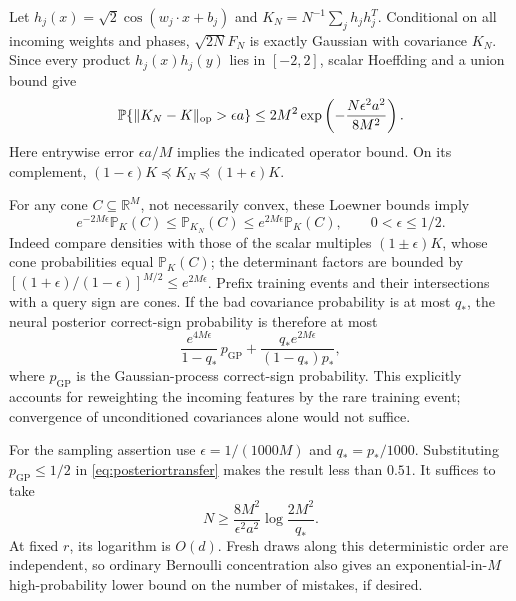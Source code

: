 \documentclass[11pt]{article}
\newcommand{\Pp}{\mathbb P}
\newcommand{\R}{\mathbb R}
\begin{document}
Let $h_j(x)=\sqrt2\cos(w_j\cdot x+b_j)$ and
$K_N=N^{-1}\sum_j h_jh_j^T$. Conditional on all incoming weights and
phases, $\sqrt{2N}F_N$ is exactly Gaussian with covariance $K_N$.
Since every product $h_j(x)h_j(y)$ lies in $[-2,2]$, scalar Hoeffding
and a union bound give
\begin{equation}\label{eq:covconcentration}
 \Pp\{\|K_N-K\|_{\rm op}>\epsilon a\}
 \le2M^2\exp\left(-\frac{N\epsilon^2a^2}{8M^2}\right).
\end{equation}
Here entrywise error $\epsilon a/M$ implies the indicated operator
bound. On its complement,
$(1-\epsilon)K\preceq K_N\preceq(1+\epsilon)K$.

For any cone $C\subseteq\R^M$, not necessarily convex, these Loewner
bounds imply
\begin{equation}\label{eq:coneratio}
 e^{-2M\epsilon}\Pp_K(C)\le\Pp_{K_N}(C)
                 \le e^{2M\epsilon}\Pp_K(C),\qquad 0<\epsilon\le1/2.
\end{equation}
Indeed compare densities with those of the scalar multiples
$(1\pm\epsilon)K$, whose cone probabilities equal $\Pp_K(C)$;
the determinant factors are bounded by
$[(1+\epsilon)/(1-\epsilon)]^{M/2}\le e^{2M\epsilon}$.
Prefix training events and their intersections with a query sign are
cones. If the bad covariance probability is at most $q_*$, the neural
posterior correct-sign probability is therefore at most
\begin{equation}\label{eq:posteriortransfer}
 \frac{e^{4M\epsilon}}{1-q_*}\,p_{\mathrm{GP}}
 +\frac{q_*e^{2M\epsilon}}{(1-q_*)p_*},
\end{equation}
where $p_{\mathrm{GP}}$ is the Gaussian-process correct-sign probability.
This explicitly accounts for reweighting the incoming features by the
rare training event; convergence of unconditioned covariances alone
would not suffice.

For the sampling assertion use $\epsilon=1/(1000M)$ and
$q_*=p_*/1000$. Substituting $p_{\mathrm{GP}}\le1/2$ in
\eqref{eq:posteriortransfer} makes the result less than $0.51$.
It suffices to take
\[
 N\ge\frac{8M^2}{\epsilon^2a^2}
                    \log\frac{2M^2}{q_*}.
\]
At fixed $r$, its logarithm is $O(d)$. Fresh draws along this deterministic
order are independent, so ordinary Bernoulli concentration also gives
an exponential-in-$M$ high-probability lower bound on the number of
mistakes, if desired.
\end{document}
